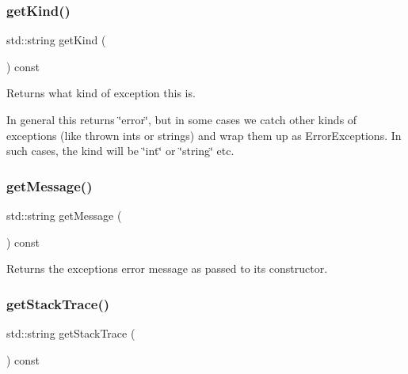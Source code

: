 \subsubsection{\texorpdfstring{get\+Kind()}{getKind()}}
{\footnotesize\ttfamily std\+::string get\+Kind (\begin{DoxyParamCaption}{ }\end{DoxyParamCaption}) const\hspace{0.3cm}{\ttfamily [virtual]}}



Returns what kind of exception this is. 

In general this returns \char`\"{}error\char`\"{}, but in some cases we catch other kinds of exceptions (like thrown ints or strings) and wrap them up as Error\+Exceptions. In such cases, the kind will be \char`\"{}int\char`\"{} or \char`\"{}string\char`\"{} etc. \mbox{\label{classErrorException_a1c1cc72e6e4257dbd29ff04a23973008}} 
\subsubsection{\texorpdfstring{get\+Message()}{getMessage()}}
{\footnotesize\ttfamily std\+::string get\+Message (\begin{DoxyParamCaption}{ }\end{DoxyParamCaption}) const\hspace{0.3cm}{\ttfamily [virtual]}}



Returns the exception\textquotesingle{}s error message as passed to its constructor. 

\mbox{\label{classErrorException_a79ec2353dbf71c4867c65c6c6df5dfce}} 
\subsubsection{\texorpdfstring{get\+Stack\+Trace()}{getStackTrace()}}
{\footnotesize\ttfamily std\+::string get\+Stack\+Trace (\begin{DoxyParamCaption}{ }\end{DoxyParamCaption}) const\hspace{0.3cm}{\ttfamily [virtual]}}



